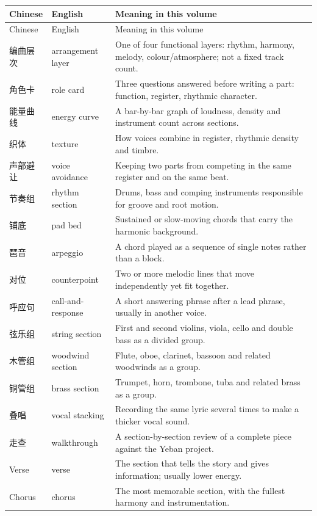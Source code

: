 \begin{longtable}{p{}p{}p{}}
\toprule
Chinese & English & Meaning in this volume \\
\midrule
\endfirsthead
\toprule
Chinese & English & Meaning in this volume \\
\midrule
\endhead
编曲层次 & arrangement layer & One of four functional layers: rhythm, harmony, melody, colour/atmosphere; not a fixed track count. \\
角色卡 & role card & Three questions answered before writing a part: function, register, rhythmic character. \\
能量曲线 & energy curve & A bar-by-bar graph of loudness, density and instrument count across sections. \\
织体 & texture & How voices combine in register, rhythmic density and timbre. \\
声部避让 & voice avoidance & Keeping two parts from competing in the same register and on the same beat. \\
节奏组 & rhythm section & Drums, bass and comping instruments responsible for groove and root motion. \\
铺底 & pad bed & Sustained or slow-moving chords that carry the harmonic background. \\
琶音 & arpeggio & A chord played as a sequence of single notes rather than a block. \\
对位 & counterpoint & Two or more melodic lines that move independently yet fit together. \\
呼应句 & call-and-response & A short answering phrase after a lead phrase, usually in another voice. \\
弦乐组 & string section & First and second violins, viola, cello and double bass as a divided group. \\
木管组 & woodwind section & Flute, oboe, clarinet, bassoon and related woodwinds as a group. \\
铜管组 & brass section & Trumpet, horn, trombone, tuba and related brass as a group. \\
叠唱 & vocal stacking & Recording the same lyric several times to make a thicker vocal sound. \\
走查 & walkthrough & A section-by-section review of a complete piece against the Yeban project. \\
Verse & verse & The section that tells the story and gives information; usually lower energy. \\
Chorus & chorus & The most memorable section, with the fullest harmony and instrumentation. \\

\end{longtable}
